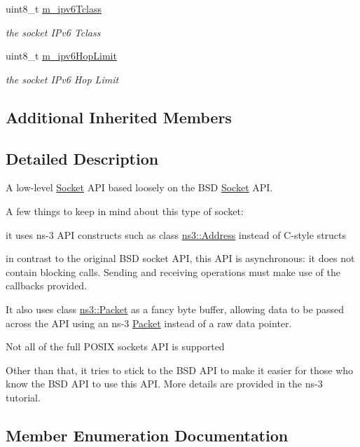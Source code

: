\begin{DoxyCompactItemize}
uint8\+\_\+t \hyperlink{classns3_1_1Socket_a755c5e4c6e00489d2c0643cf05727899}{m\+\_\+ipv6\+Tclass}
\begin{DoxyCompactList}\small\item\em the socket I\+Pv6 Tclass \end{DoxyCompactList}\item 
uint8\+\_\+t \hyperlink{classns3_1_1Socket_a44885a08bce974cbfa1b5ea68c806967}{m\+\_\+ipv6\+Hop\+Limit}
\begin{DoxyCompactList}\small\item\em the socket I\+Pv6 Hop Limit \end{DoxyCompactList}\end{DoxyCompactItemize}
\subsection*{Additional Inherited Members}


\subsection{Detailed Description}
A low-\/level \hyperlink{classns3_1_1Socket}{Socket} A\+PI based loosely on the B\+SD \hyperlink{classns3_1_1Socket}{Socket} A\+PI.

A few things to keep in mind about this type of socket\+: 


\begin{DoxyItemize}
\item it uses ns-\/3 A\+PI constructs such as class \hyperlink{classns3_1_1Address}{ns3\+::\+Address} instead of C-\/style structs
\item in contrast to the original B\+SD socket A\+PI, this A\+PI is asynchronous\+: it does not contain blocking calls. Sending and receiving operations must make use of the callbacks provided.
\item It also uses class \hyperlink{classns3_1_1Packet}{ns3\+::\+Packet} as a fancy byte buffer, allowing data to be passed across the A\+PI using an ns-\/3 \hyperlink{classns3_1_1Packet}{Packet} instead of a raw data pointer.
\item Not all of the full P\+O\+S\+IX sockets A\+PI is supported
\end{DoxyItemize}

Other than that, it tries to stick to the B\+SD A\+PI to make it easier for those who know the B\+SD A\+PI to use this A\+PI. More details are provided in the ns-\/3 tutorial. 

\subsection{Member Enumeration Documentation}
